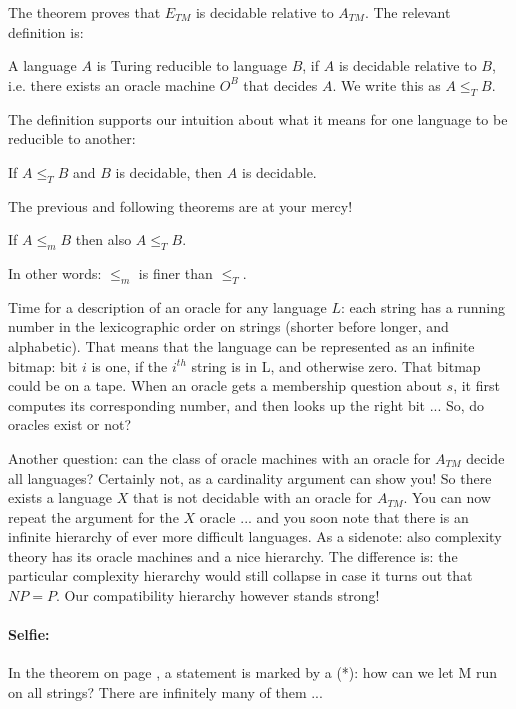 The theorem proves that $E_{TM}$ is decidable relative to
$A_{TM}$. The relevant definition is:

\begin{definition}
A language $A$ is Turing reducible to language $B$, if $A$
is decidable relative to $B$, i.e. there exists an oracle machine
$O^B$ that decides $A$. We write this as $A \leq_T B$.
\end{definition}

The definition supports our intuition about what it means for one
language to be reducible to another:

\begin{theorem}
If $A \leq_T B$ and $B$ is decidable, then $A$ is decidable.
\end{theorem}

The previous and following theorems are at your mercy!

\begin{theorem}
If $A \leq_m B$ then also $A \leq_T B$.

In other words: $\leq_m$ is finer than $\leq_T$.
\end{theorem}

Time for a description of an oracle for any language $L$: each
string has a running number in the lexicographic order on strings
(shorter before longer, and alphabetic). That means that the language
can be represented as an infinite bitmap: bit $i$ is one, if the
$i^{th}$ string is in L, and otherwise zero. That bitmap could be on a
tape. When an oracle gets a membership question about $s$, it first
computes its corresponding number, and then looks up the right bit
... So, do oracles exist or not?

Another question: can the class of oracle machines with an oracle for
$A_{TM}$ decide all languages? Certainly not, as a cardinality
argument can show you! So there exists a language $X$ that is not
decidable with an oracle for $A_{TM}$. You can now repeat the argument
for the $X$ oracle ... and you soon note that there is an infinite
hierarchy of ever more difficult languages. As a sidenote: also
complexity theory has its oracle machines and a nice hierarchy. The
difference is: the particular complexity hierarchy would still
collapse in case it turns out that $NP = P$. Our compatibility
hierarchy however stands strong!

\paragraph{Selfie:} In the theorem on page \pageref{allestrings},
a statement is marked by a (*): how can we let M run on all strings?
There are infinitely many of them ...


